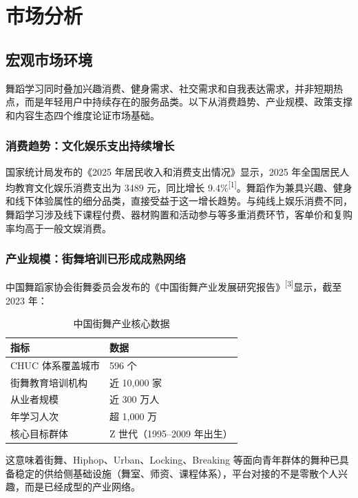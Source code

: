 \documentclass[12pt,a4paper]{ctexart}
\begin{document}
\section{市场分析}

\subsection{宏观市场环境}

舞蹈学习同时叠加兴趣消费、健身需求、社交需求和自我表达需求，并非短期热点，而是年轻用户中持续存在的服务品类。以下从消费趋势、产业规模、政策支撑和内容生态四个维度论证市场基础。

\subsubsection{消费趋势：文化娱乐支出持续增长}

国家统计局发布的《2025 年居民收入和消费支出情况》显示，2025 年全国居民人均教育文化娱乐消费支出为 3489 元，同比增长 9.4\%\textsuperscript{[1]}。舞蹈作为兼具兴趣、健身和线下体验属性的细分品类，直接受益于这一增长趋势。与纯线上娱乐消费不同，舞蹈学习涉及线下课程付费、器材购置和活动参与等多重消费环节，客单价和复购率均高于一般文娱消费。

\subsubsection{产业规模：街舞培训已形成成熟网络}

中国舞蹈家协会街舞委员会发布的《中国街舞产业发展研究报告》\textsuperscript{[3]}显示，截至 2023 年：

\begin{table}[H]
\centering
\caption{中国街舞产业核心数据}
\begin{tabularx}{\textwidth}{L{4cm}X}
\toprule
\textbf{指标} & \textbf{数据} \\
\midrule
CHUC 体系覆盖城市 & 596 个 \\
街舞教育培训机构 & 近 10,000 家 \\
从业者规模 & 近 300 万人 \\
年学习人次 & 超 1,000 万 \\
核心目标群体 & Z 世代（1995--2009 年出生） \\
\bottomrule
\end{tabularx}
\end{table}

这意味着街舞、Hiphop、Urban、Locking、Breaking 等面向青年群体的舞种已具备稳定的供给侧基础设施（舞室、师资、课程体系），平台对接的不是零散个人兴趣，而是已经成型的产业网络。
\end{document}
